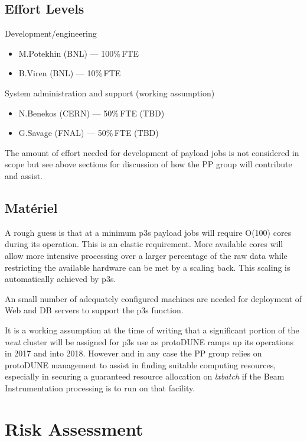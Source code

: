 \documentclass[pdftex,12pt,letter]{article}
\newcommand{\pd}{protoDUNE\xspace}
\begin{document}
\subsection{Effort Levels}

Development/engineering
\begin{itemize}
\item M.Potekhin (BNL) --- 100\%\,FTE
\item B.Viren (BNL) --- 10\%\,FTE
\end{itemize}

\noindent System administration and support (working assumption)

\begin{itemize}
\item N.Benekos (CERN) --- 50\%\,FTE (TBD)
\item G.Savage (FNAL) --- 50\%\,FTE (TBD)
\end{itemize}

\noindent The amount of effort needed for development of payload jobs
is not considered in scope but see above sections for discussion of
how the PP group will contribute and assist.

\subsection{Mat\'eriel}

A rough guess is that at a minimum p3s payload jobs will require O(100) cores
during its operation.  This is an elastic requirement.  More available
cores will allow more intensive processing over a larger percentage of
the raw data while restricting the available hardware can be met by a
scaling back.  This scaling is automatically achieved by p3s.

An small number of adequately configured machines are needed for
deployment of Web and DB servers to support the p3s function.  

It is a working assumption at the time of writing that a significant
portion of the \textit{neut} cluster \cite{neut} will be assigned for
p3s use as \pd ramps up its operations in 2017 and into 2018.  However
and in any case the PP group relies on \pd management to assist in
finding suitable computing resources, especially in securing a guaranteed
resource allocation on \textit{lxbatch} if the Beam Instrumentation
processing is to run on that facility.


\section{Risk Assessment}
\label{sec:risk}
\end{document}
